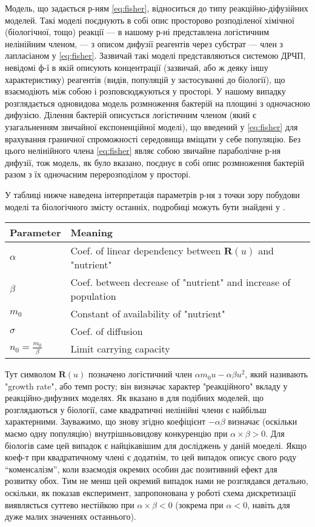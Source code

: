 Модель, що задається р-ням \eqref{eq:fisher}, відноситься до типу реакційно-діфузійних моделей. Такі моделі поєднують в собі опис просторово розподіленої хімічної (біологічної, тощо) реакції --- в нашому р-ні представлена логістичним нелінійним членом, --- з описом дифузії реагентів через субстрат --- член з лапласіаном у \eqref{eq:fisher}. Зазвичай такі моделі представляються системою ДРЧП, невідомі ф-ї в якій описують концентрації (зазвичай, або ж деяку іншу характеристику) реагентів (видів, популяцій у застосуванні до біології), що взаємодіють між собою і розповсюджуються у просторі. У нашому випадку розглядається одновидова модель розмноження бактерій на площині з одночасною дифузією. Ділення бактерій описується логістичним членом (який є узагальненням звичайної експоненційної моделі), що введений у \eqref{eq:fisher} для врахування граничної спроможності середовища вміщати у себе популяцію. Без цього нелінійного члена \eqref{eq:fisher} являє собою звичайне параболічне р-ня дифузії, тож модель, як було вказано, поєднує в собі опис розмноження бактерій разом з їх одночасним перерозподілом у просторі.

У таблиці нижче наведена інтерпретація параметрів р-ня з точки зору побудови моделі та біологічного змісту останніх, подробиці можуть бути знайдені у \cite{bio}.
\vspace{10pt}
\begin{center}
	\begin{tabular}{|l|l|}
	\hline
	Parameter & Meaning \\
	\hline
	$\alpha$  & Coef. of linear dependency between $\mathbf{R}(u)$ and "nutrient" \\ \hline
	$\beta$ & Coef. between decrease of "nutrient" and increase of population \\ \hline
	$m_{0}$  & Constant of availability of "nutrient" \\ \hline
	$\sigma$ & Coef. of diffusion \\ \hline
	$n_0 = \frac{m_0}{\beta}$ & Limit carrying capacity \\ \hline
	\end{tabular}
\end{center}
\vspace{10pt}
Тут символом $\mathbf{R}(u)$ позначено логістичний член $\alpha m_0u - \alpha\beta u^2$, який називають "growth rate", або темп росту; він визначає характер "реакційного" вкладу у реакційно-дифузних моделях. Як вказано в \cite{bio} для подібних моделей, що розглядаються у біології, саме квадратичні нелінійні члени є найбільш характерними. Зауважимо, що знову згідно \cite{bio} коефіцієнт $ - \alpha\beta$ визначає (оскільки маємо одну популяцію) внутрішньовидову конкуренцію при $\alpha\times\beta > 0$. Для біологів саме цей випадок є найцікавішим для досліджень у даній моеделі. Якщо коеф-т при квадратичному члені є додатнім, то цей випадок описує свого роду ``коменсалізм'', коли взаємодія окремих особин дає позитивний ефект для розвитку обох. Тим не менш цей окремий випадок нами не розглядався детально, оскільки, як показав експеримент, запропонована у роботі схема дискретизації виявляється суттево нестійкою при $\alpha\times\beta < 0$ (зокрема при $\alpha < 0$, навіть для дуже малих значеннях останнього).